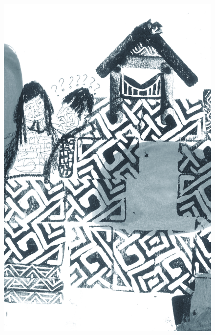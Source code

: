 \pagebreak
\thispagestyle{empty}
\begin{figure}
\vspace*{-2cm}
\hspace*{-2.2cm}\includegraphics[width=138mm]{./imgs/img9.jpg}
\end{figure}

\chapter*{}

\mbox{}\vspace*{\fill}


